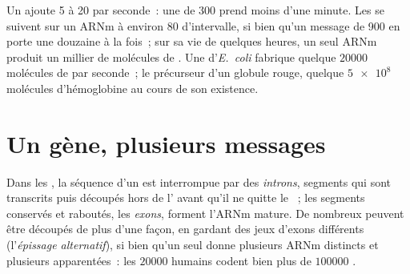 \begin{example}\label{ex:g11:gene-expression:speed}
Un  ajoute 5 à 20  par seconde~: une  de
300  prend moins d'une minute. Les  se suivent
sur un ARNm à environ 80  d'intervalle, si bien qu'un
message de 900  en porte une douzaine à la fois~; sur sa vie
de quelques heures, un seul ARNm produit un millier de molécules de
. Une  d'\emph{E.~coli} fabrique quelque
$\num{20000}$ molécules de  par seconde~; le précurseur d'un
globule rouge, quelque $\num{5e8}$ molécules d'hémoglobine au cours de
son existence.
\end{example}

\section{Un gène, plusieurs messages}

\begin{proposition}\label{prop:g11:gene-expression:splicing}
Dans les , la séquence d'un  est interrompue par
des \emph{introns}, segments qui sont transcrits puis
découpés hors de l' avant qu'il ne quitte le ~; les segments
conservés et raboutés, les \emph{exons}, forment l'ARNm mature. De
nombreux  peuvent être découpés de plus d'une façon, en gardant
des jeux d'exons différents (l'\emph{épissage alternatif}), si bien
qu'un seul  donne plusieurs ARNm distincts et plusieurs 
apparentées~: les $\num{20000}$  humains codent bien plus de
$\num{100000}$ .
\end{proposition}
\admitted


